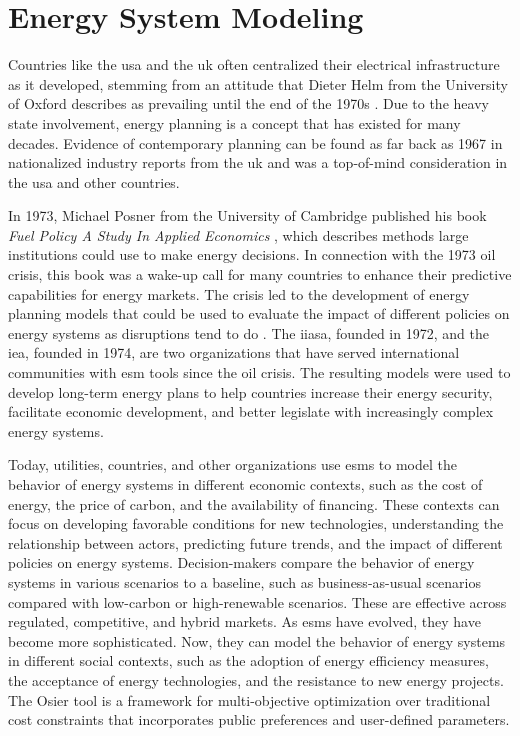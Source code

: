 \section{Energy System Modeling}
\label{sec:esm}

Countries like the \gls{usa} and the \gls{uk} often centralized their electrical
infrastructure as it developed, stemming from an attitude that Dieter
Helm from the University of Oxford describes as prevailing until the end
of the 1970s \cite{helm_energy_2002}. Due to the heavy state involvement,
energy planning is a concept that has existed for many decades. Evidence of contemporary planning can be found as far back as 1967 in
nationalized industry reports from the \gls{uk}
\cite{treasury_nationalised_1967} and was a top-of-mind consideration in the
\gls{usa} and other countries.

In 1973, Michael Posner from the University of Cambridge published his book
\textit{Fuel Policy A Study In Applied Economics} \cite{posner_fuel_1973},
which describes methods large institutions could use to make
energy decisions. In connection with the 1973 oil crisis, this book was a wake-up call for many countries to enhance their predictive capabilities for energy markets. The crisis led to the development of energy planning models
that could be used to evaluate the impact of different policies on energy
systems as disruptions tend to do \cite{plazas_disrupt_2022}. The \gls{iiasa},
founded in 1972, and the \gls{iea}, founded in 1974, are two organizations that
have served international communities with \gls{esm} tools since the oil
crisis. The resulting models were used to develop long-term energy plans to
help countries increase their energy security, facilitate economic development,
and better legislate with increasingly complex energy systems.

Today, utilities, countries, and other organizations use \glspl{esm} to model
the behavior of energy systems in different economic contexts, such as the cost
of energy, the price of carbon, and the availability of financing. These
contexts can focus on developing favorable conditions for new technologies,
understanding the relationship between actors, predicting future trends, and
the impact of different policies on energy systems. Decision-makers compare the
behavior of energy systems in various scenarios to a baseline, such as
business-as-usual scenarios compared with low-carbon or high-renewable
scenarios. These are effective across regulated, competitive, and hybrid
markets. As \glspl{esm} have evolved, they have become more sophisticated. Now,
they can model the behavior of energy systems in different social contexts,
such as the adoption of energy efficiency measures, the acceptance of energy
technologies, and the resistance to new energy projects. The Osier tool
\cite{Dotson_osier} is a framework for multi-objective optimization over traditional cost constraints that incorporates public preferences and user-defined parameters.

